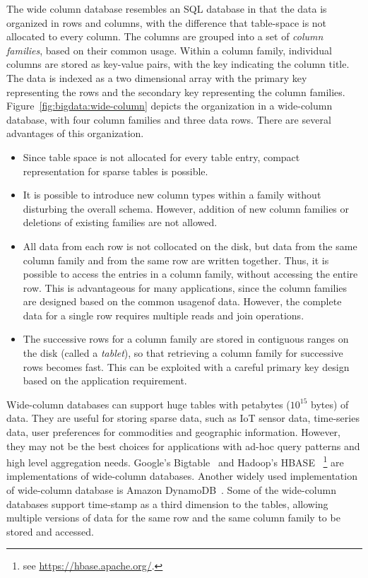 The wide column database resembles an SQL database in that the data is organized
in rows and columns, with the difference that table-space is not allocated to every column. The columns are grouped
into a set of {\em column families}, based on their common usage. Within a column family, individual columns are 
stored as key-value pairs, with the key indicating the column title. The data is indexed as a two dimensional
array with the primary key representing the rows and the secondary key representing the column families. 
%
Figure~\ref{fig:bigdata:wide-column} depicts the organization in a wide-column database, with four column families 
and three data rows. There are several advantages of this organization.
\begin{itemize}
	\item Since table space is not allocated for every table entry, compact representation for sparse tables
		is possible.
	\item It is possible to introduce new column types within a family without disturbing the overall schema.
		However, addition of new column families or deletions of existing families are not allowed.
	\item All data from each row is not collocated on the disk, but data from the same column family and from 
		the same row are written together. Thus, it is possible to access the entries in a column family, 
		without accessing the entire row. This is advantageous for many applications, since the column 
		families are designed based on the common usagenof data. However, the complete data for a single
		row requires multiple reads and join operations.
	\item The successive rows for a column family are stored in contiguous ranges on the disk (called a {\em
		tablet}), so that retrieving a column family for successive rows becomes fast. This can be exploited 
		with a careful primary key design based on the application requirement. 
\end{itemize}
\noindent
 
Wide-column databases can support huge tables with petabytes ($10^{15}$ bytes) of data. They are useful for storing sparse data, 
such as IoT sensor data, time-series data, user preferences for commodities and geographic information. However, they may not 
be the best choices for applications with ad-hoc query patterns and high level aggregation needs.
%
  
Google's Bigtable~\citep{Chang:2008} and Hadoop's HBASE
~\footnote{see \url{https://hbase.apache.org/}.} 
are implementations of 
wide-column databases. Another widely used implementation of wide-column database is Amazon DynamoDB~\citep{Sivasubramanian:2012}.
Some of the wide-column databases support time-stamp as a third dimension to the tables, allowing multiple versions of data for 
the same row and the same column family to be stored and accessed. 

